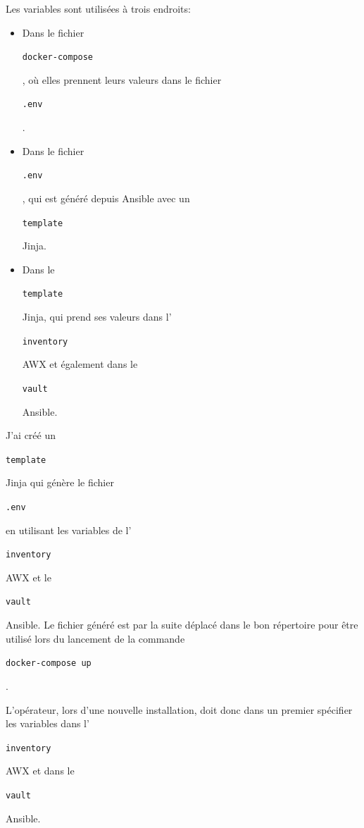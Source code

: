 \documentclass[12pt, a4paper, twoside]{article}
\begin{document}
Les variables sont utilisées à trois endroits:
\begin{itemize}
    \item Dans le fichier \begin{code}\texttt{docker-compose}\end{code}, où elles prennent leurs valeurs dans le fichier\begin{code}\texttt{.env}\end{code}.
    \item Dans le fichier\begin{code}\texttt{.env}\end{code}, qui est généré depuis \gls{Ansible} avec un \begin{code}\texttt{template}\end{code} \gls{Jinja}.
    \item Dans le \begin{code}\texttt{template}\end{code} \gls{Jinja}, qui prend ses valeurs dans l'\begin{code}\texttt{inventory}\end{code} AWX et également dans le \begin{code}\texttt{vault}\end{code} \gls{Ansible}.
\end{itemize}

J'ai créé un \begin{code}\texttt{template}\end{code} \gls{Jinja} qui génère le fichier \begin{code}\texttt{.env}\end{code} en utilisant les variables de l'\begin{code}\texttt{inventory}\end{code} AWX et le \begin{code}\texttt{vault}\end{code} \gls{Ansible}.
Le fichier généré est par la suite déplacé dans le bon répertoire pour être utilisé lors du lancement de la commande \begin{code}\texttt{docker-compose up}\end{code}. 

L'opérateur, lors d'une nouvelle installation, doit donc dans un premier spécifier les variables dans l'\begin{code}\texttt{inventory}\end{code} AWX et dans le \begin{code}\texttt{vault}\end{code}  \gls{Ansible}.
\end{document}
